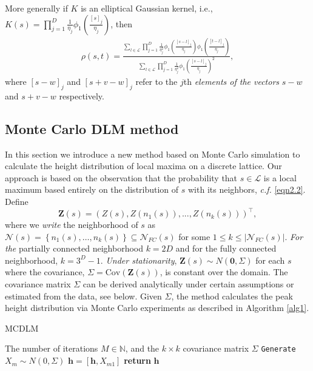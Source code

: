 \documentclass{article}
\newcommand{\nt}[1]{\textit{\color{red} #1}}
\begin{document}
More generally if $K$ is an elliptical Gaussian kernel, i.e., $K(s) = \prod_{j=1}^D\frac{1}{\eta_j}\phi_1\left(\frac{[s]_j}{\eta_j}\right)$, then 
\begin{align}
    \rho(s, t) = \frac{\sum_{l\in \mathcal{L}}\prod_{j=1}^D\frac{1}{\eta_j^2}\phi_1\left(\frac{[s-l]_j}{\eta_j}\right)\phi_1\left(\frac{[t-l]_j}{\eta_j}\right)}{\sum_{l\in \mathcal{L}}\prod_{j=1}^D\frac{1}{\eta_j^2}\phi_1\left(\frac{[s-l]_j}{\eta_j}\right)^2}, \label{eqn2.8}
\end{align}
where $[s-w]_j$ and $[s+v-w]_j$ refer to the $j$th \nt{elements of the vectors} $s-w$ and $s+v-w$ respectively. 

\subsection{Monte Carlo DLM method}
\label{sec2.5}
In this section we introduce a new method based on Monte Carlo simulation to calculate the height distribution of local maxima on a discrete lattice. Our approach is based on the observation that the probability that $s \in \mathcal{L}$ is a local maximum based entirely on the distribution of $s$ with its neighbors, \nt{c.f.} \eqref{eqn2.2}. Define 
\begin{equation*}
    \mathbf{Z}(s) = \left(Z(s), Z(n_1(s)), ..., Z(n_k(s))\right)^\top,
\end{equation*}
where we \nt{write} the neighborhood of $s$ as 
\nt{$\mathcal{N}(s) = \left\lbrace n_1(s), \dots, n_k(s)  \right\rbrace \subseteq \mathcal{N}_{FC}(s)$} for some \nt{$ 1 \leq k \leq |\mathcal{N}_{FC}(s)|$}. \nt{For the} partially connected neighborhood $k = 2D$ and for the fully connected neighborhood, $k = 3^D-1$. \nt{Under stationarity}, $\mathbf{Z}(s) \sim N(\mathbf{0}, \Sigma)$ for each $s$ where the covariance, $\Sigma = \mathrm{Cov}(\mathbf{Z}(s))$, is constant over the domain. The covariance matrix $\Sigma$ can be derived analytically under certain assumptions or estimated from the data, see below. Given $\Sigma$, the method calculates the peak height distribution via Monte Carlo experiments as described in Algorithm \ref{alg1}.

\begin{algorithm}[!htp]
\caption{MCDLM}
\label{alg1}
\begin{algorithmic}[1]
\Require The number of iterations $M\in \mathbb{N}$, and the \nt{$k \times k$} covariance matrix $\Sigma$
    \State \texttt{Generate $X_m \sim N(0, \Sigma)$}
        \State $\boldsymbol{h} = \left[\boldsymbol{h}, X_{m1}\right]$
    \EndIf
  \EndFor
  \State \textbf{return} $\boldsymbol{h}$
\EndProcedure
\end{algorithmic}
\end{algorithm}
\end{document}
